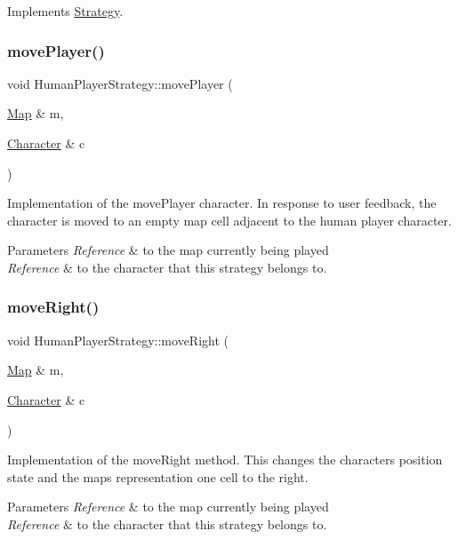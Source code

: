 Implements \hyperlink{classStrategy}{Strategy}.

\hypertarget{classHumanPlayerStrategy_a2697fde934ee29e34a03191b7002726b}{}\label{classHumanPlayerStrategy_a2697fde934ee29e34a03191b7002726b} 
\subsubsection{\texorpdfstring{move\+Player()}{movePlayer()}}
{\footnotesize\ttfamily void Human\+Player\+Strategy\+::move\+Player (\begin{DoxyParamCaption}\item[{\hyperlink{classMap}{Map} \&}]{m,  }\item[{\hyperlink{classCharacter}{Character} \&}]{c }\end{DoxyParamCaption})}

Implementation of the move\+Player character. In response to user feedback, the character is moved to an empty map cell adjacent to the human player character. 
\begin{DoxyParams}{Parameters}
{\em Reference} & to the map currently being played \\
\hline
{\em Reference} & to the character that this strategy belongs to. \\
\hline
\end{DoxyParams}
\hypertarget{classHumanPlayerStrategy_a6db6f603b2decabc42cf6e904457dac4}{}\label{classHumanPlayerStrategy_a6db6f603b2decabc42cf6e904457dac4} 
\subsubsection{\texorpdfstring{move\+Right()}{moveRight()}}
{\footnotesize\ttfamily void Human\+Player\+Strategy\+::move\+Right (\begin{DoxyParamCaption}\item[{\hyperlink{classMap}{Map} \&}]{m,  }\item[{\hyperlink{classCharacter}{Character} \&}]{c }\end{DoxyParamCaption})\hspace{0.3cm}{\ttfamily [virtual]}}

Implementation of the move\+Right method. This changes the character\textquotesingle{}s position state and the map\textquotesingle{}s representation one cell to the right. 
\begin{DoxyParams}{Parameters}
{\em Reference} & to the map currently being played \\
\hline
{\em Reference} & to the character that this strategy belongs to. \\
\hline
\end{DoxyParams}


